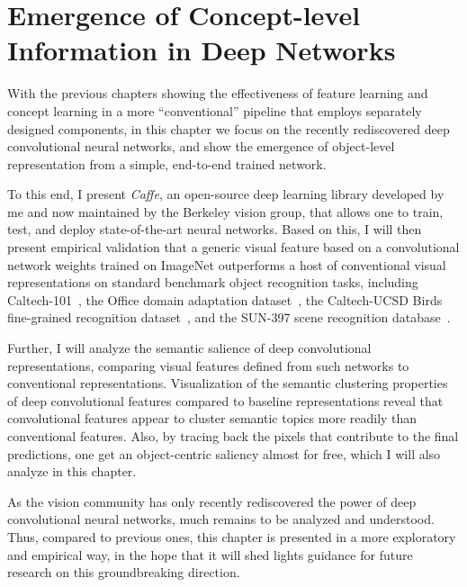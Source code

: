 \chapter{Emergence of Concept-level Information in Deep Networks}

With the previous chapters showing the effectiveness of feature learning and concept learning in a more ``conventional'' pipeline that employs separately designed components, in this chapter we focus on the recently rediscovered deep convolutional neural networks, and show the emergence of object-level representation from a simple, end-to-end trained network.

To this end, I present \emph{Caffe}, an open-source deep learning library developed by me and now maintained by the Berkeley vision group, that allows one to train, test, and deploy state-of-the-art neural networks. Based on this, I will then present empirical validation that a generic visual
feature based on a convolutional network weights trained on ImageNet
outperforms a host of conventional visual representations on standard
benchmark object recognition tasks, including Caltech-101~\cite{caltech101},
the Office domain adaptation dataset~\cite{saenko2010adapting},
the Caltech-UCSD Birds fine-grained recognition dataset~\cite{birds},
and the SUN-397 scene recognition database~\cite{xiao10}.


Further, I will analyze the semantic salience of deep convolutional
representations, comparing visual features defined from such networks
to conventional representations. Visualization of the
semantic clustering properties of deep convolutional features compared
to baseline representations reveal that convolutional features
appear to cluster semantic topics more readily than conventional
features. Also, by tracing back the pixels that contribute to the final predictions, one get an object-centric saliency almost for free, which I will also analyze in this chapter.

As the vision community has only recently rediscovered the power of deep convolutional neural networks, much remains to be analyzed and understood. Thus, compared to previous ones, this chapter is presented in a more exploratory and empirical way, in the hope that it will shed lights guidance for future research on this groundbreaking direction.

